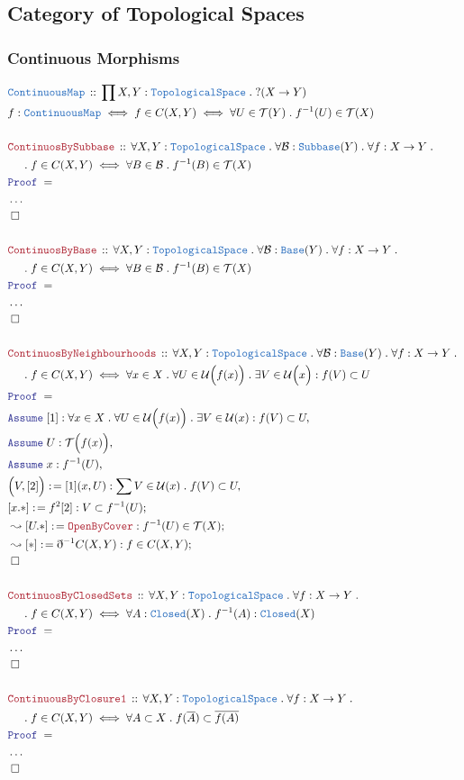 \documentclass[12pt]{scrartcl}
\newcommand{\TYPE}[1]{\textcolor{NavyBlue}{\mathtt{#1}}}
\newcommand{\LOGIC}[1]{\textcolor{Blue}{\mathtt{#1}}}
\newcommand{\THM}[1]{\textcolor{Maroon}{\mathtt{#1}}}
\renewcommand{\.}{\; . \;}
\newcommand{\de}{: \kern 0.1pc =}
\newcommand{\Theorem}[2]{& \THM{#1} \, :: \, #2 \\ & \Proof = \\ }
\newcommand{\DeclareType}[2]{& \TYPE{#1} \, :: \, #2 \\}
\newcommand{\DefineNamedType}[4]{& #1 : \TYPE{#2} \iff #3 \iff #4 \\}
\newcommand{\NewLine}{\\ & \kern 1pc}
\newcommand{\Page}[1]{ \begin{align*} #1 \end{align*}   }
\newcommand{ \bd }{ \ByDef }
\newcommand{\NoProof}{ & \ldots \\ \EndProof}
\newcommand{\Say}[3]{& #1 \de #2 : #3, \\}
\newcommand{\Conclude}[3]{& #1 \de #2 : #3; \\}
\newcommand{\DeriveConclude}[3]{& \leadsto #1 \de #2 : #3 ; \\}
\newcommand{\Assume}[2]{& \LOGIC{Assume} \; #1 : #2, \\}
\newcommand{\QED}{\; \square}
\newcommand{\EndProof}{& \QED \\}
\newcommand{\ByDef}{\eth}
\newcommand{\Proof}{\LOGIC{Proof} \; }
\newcommand{\B}{\mathcal{B}}
\newcommand{\TS}{\TYPE{TopologicalSpace}}
\newcommand{\T}{\mathcal{T}}
\renewcommand{\U}{\mathcal{U}}
\begin{document}
\subsection{Category of Topological Spaces}
\subsubsection{Continuous Morphisms}
\Page{
	\DeclareType{ContinuousMap}
	{
		\prod X,Y : \TS \.
		?( X \to Y)
	}
	\DefineNamedType{f}{ContinuousMap}{f \in C(X,Y)}
	{ \forall U \in \T(Y) \. f^{-1}(U) \in \T(X)  }
	\\
	\Theorem{ContinuosBySubbase}
	{
		\forall X,Y : \TS \.
		\forall \B : \TYPE{Subbase}(Y) \.
		\forall f : X \to Y \.
		\NewLine \. 
		f \in C(X,Y) \iff
		\forall B \in \B \.
		f^{-1}(B) \in \T(X)
	}
	\NoProof
	\\
	\Theorem{ContinuosByBase}
	{
		\forall X,Y : \TS \.
		\forall \B : \TYPE{Base}(Y) \.
		\forall f : X \to Y \.
		\NewLine \. 
		f \in C(X,Y) \iff
		\forall B \in \B \.
		f^{-1}(B) \in \T(X)
	}
	\NoProof
	\\
	\Theorem{ContinuosByNeighbourhoods}
	{
		\forall X,Y : \TS \.
		\forall \B : \TYPE{Base}(Y) \.
		\forall f : X \to Y \.
		\NewLine \. 
		f \in C(X,Y) \iff
		\forall x \in X \.
		\forall U \in \U\Big(f(x)\Big) \.
		\exists V \in \U\Big(x\Big) :
		f(V) \subset U
	}
	\Assume{[1]}
	{
		\forall x \in X \.
		\forall U \in \U\Big(f(x)\Big) \.
		\exists V \in \U( x ) :
		f(V) \subset U
	}
	\Assume{U}{\T\Big( f(x) \Big)}
	\Assume{x}{f^{-1}(U)}
	\Say{\Big(V,[2]\Big)}{[1](x,U) }{ \sum V \in \U(x) \. f(V) \subset U }
	\Conclude{[x.*]}{f^{2}[2]}{V \subset f^{-1}(U)}
	\DeriveConclude{[U.*]}{\THM{OpenByCover}}{ f^{-1}(U) \in \T(X) }
	\DeriveConclude{[*]}{\bd^{-1} C(X,Y)}{f \in C(X,Y)}
	\EndProof
	\\
	\Theorem{ContinuosByClosedSets}
	{
		\forall X,Y : \TS \.
		\forall f : X \to Y \.
		\NewLine \. 
		f \in C(X,Y) \iff
		\forall A : \TYPE{Closed}(X) \.
		f^{-1}(A) : \TYPE{Closed}(X)
	}
	\NoProof
	\\
	\Theorem{ContinuousByClosure1}
	{
		\forall X,Y : \TS \.
		\forall f : X \to Y \.
		\NewLine \.
		f \in C(X,Y) \iff
		\forall A \subset X \. 
		f(\overline{A}) \subset \overline{f(A)}
	}
	\NoProof
}
\end{document}
